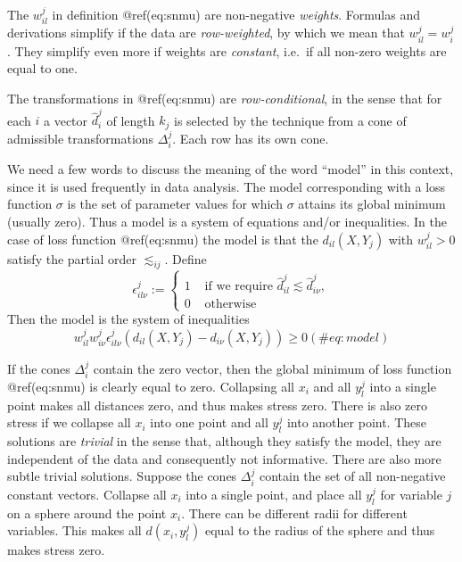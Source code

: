 \documentclass[
  12pt,
  letterpaper,
  DIV=11,
  numbers=noendperiod]{scrartcl}
\begin{document}
The \(w_{il}^j\) in definition @ref(eq:snmu) are non-negative
\emph{weights}. Formulas and derivations simplify if the data are
\emph{row-weighted}, by which we mean that \(w_{il}^j=w_i^j\). They
simplify even more if weights are \emph{constant}, i.e.~if all non-zero
weights are equal to one.

The transformations in @ref(eq:snmu) are \emph{row-conditional}, in the
sense that for each \(i\) a vector \(\hat d_i^j\) of length \(k_j\) is
selected by the technique from a cone of admissible transformations
\(\Delta_i^j\). Each row has its own cone.

We need a few words to discuss the meaning of the word ``model'' in this
context, since it is used frequently in data analysis. The model
corresponding with a loss function \(\sigma\) is the set of parameter
values for which \(\sigma\) attains its global minimum (usually zero).
Thus a model is a system of equations and/or inequalities. In the case
of loss function @ref(eq:snmu) the model is that the \(d_{il}(X,Y_j)\)
with \(w_{il}^j>0\) satisfy the partial order \(\lesssim_{ij}\). Define
\begin{equation}
\epsilon^j_{il\nu}:=
\begin{cases}
1&\text{ if we require }\hat d^j_{il}\lesssim\hat d^j_{i\nu},\\
0&\text{ otherwise}
\end{cases}
\end{equation} Then the model is the system of inequalities
\begin{equation}
w_{il}^jw_{i\nu}^j\epsilon^j_{il\nu}(d_{il}(X,Y_j)-d_{i\nu}(X,Y_j))\geq 0
(\#eq:model)
\end{equation}

If the cones \(\Delta_i^j\) contain the zero vector, then the global
minimum of loss function @ref(eq:snmu) is clearly equal to zero.
Collapsing all \(x_i\) and all \(y_l^j\) into a single point makes all
distances zero, and thus makes stress zero. There is also zero stress if
we collapse all \(x_i\) into one point and all \(y_l^j\) into another
point. These solutions are \emph{trivial} in the sense that, although
they satisfy the model, they are independent of the data and
consequently not informative. There are also more subtle trivial
solutions. Suppose the cones \(\Delta_i^j\) contain the set of all
non-negative constant vectors. Collapse all \(x_i\) into a single point,
and place all \(y_l^j\) for variable \(j\) on a sphere around the point
\(x_i\). There can be different radii for different variables. This
makes all \(d(x_i,y_l^j)\) equal to the radius of the sphere and thus
makes stress zero.
\end{document}
